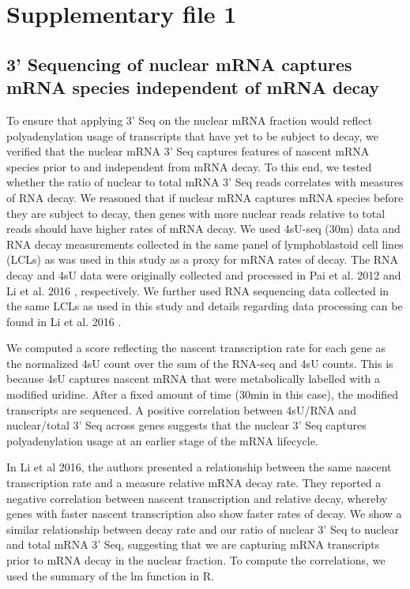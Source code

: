 \section{Supplementary file 1}\label{ch02-Supplementary file 1} 

\subsection{3' Sequencing of nuclear mRNA captures mRNA species independent of mRNA decay}\label{ch02-decay}

To ensure that applying 3' Seq on the nuclear mRNA fraction would reflect polyadenylation usage of transcripts that have yet to be subject to decay, we verified that the nuclear mRNA 3' Seq captures features of nascent mRNA species prior to and independent from mRNA decay. To this end, we tested whether the ratio of nuclear to total mRNA 3' Seq reads correlates with measures of RNA decay. We reasoned that if nuclear mRNA captures mRNA species before they are subject to decay, then genes with more nuclear reads relative to total reads should have higher rates of mRNA decay. We used 4sU-seq (30m) data and RNA decay measurements collected in the same panel of lymphoblastoid cell lines (LCLs) as was used in this study as a proxy for mRNA rates of decay. The RNA decay and 4sU data were originally collected and processed in Pai et al. 2012 \citep{pai_contribution_2012} and Li et al. 2016 \citep{li_rna_2016}, respectively. We further used RNA sequencing data collected in the same LCLs as used in this study and details regarding data processing can be found in Li et al. 2016 \citep{li_rna_2016}. 

We computed a score reflecting the nascent transcription rate for each gene as the normalized 4sU count over the sum of the RNA-seq and 4sU counts. This is because 4sU captures nascent mRNA that were metabolically labelled with a modified uridine. After a fixed amount of time (30min in this case), the modified transcripts are sequenced. A positive correlation between 4sU/RNA and nuclear/total 3' Seq across genes suggests that the nuclear 3' Seq captures polyadenylation usage at an earlier stage of the mRNA lifecycle. 

In Li et al 2016, the authors presented a relationship between the same nascent transcription rate and a measure relative mRNA decay rate. They reported a negative correlation between nascent transcription and relative decay, whereby genes with faster nascent transcription also show faster rates of decay. We show a similar relationship between decay rate and our ratio of nuclear 3' Seq to nuclear and total mRNA 3' Seq, suggesting that we are capturing mRNA transcripts prior to mRNA decay in the nuclear fraction. To compute the correlations, we used the summary of the lm function in R. 

